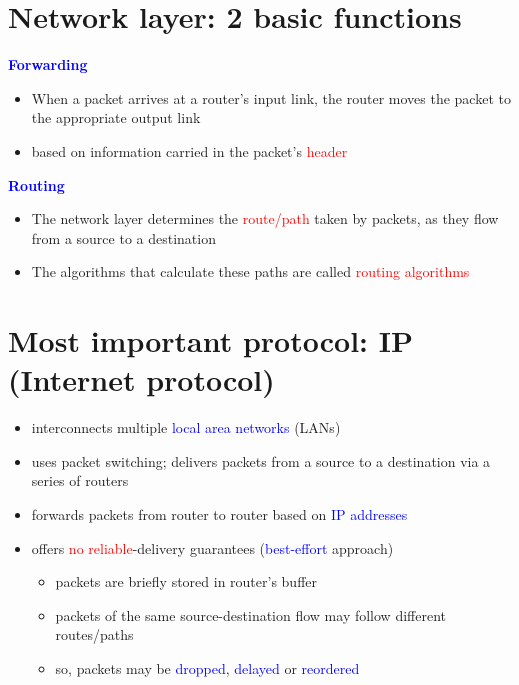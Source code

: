 \documentclass[11pt]{article}
\begin{document}
\section*{Network layer: 2 basic functions}

\textbf{\textcolor{blue}{Forwarding}}

\begin{itemize}
	\item When a packet arrives at a router's input link, the router moves the packet to the appropriate output link
	\item based on information carried in the packet's \textcolor{red}{header}
\end{itemize}

\textbf{\textcolor{blue}{Routing}}
\begin{itemize}
	\item The network layer determines the \textcolor{red}{route/path} taken by packets, as they flow from a source to a destination
	\item The algorithms that calculate these paths are called \textcolor{red}{routing algorithms}
\end{itemize}

\section*{Most important protocol: IP (Internet protocol)}

\begin{itemize}
	\item interconnects multiple \textcolor{blue}{local area networks} (LANs)
	\item uses packet switching; delivers packets from a source to a destination via a series of routers
	\item forwards packets from router to router based on \textcolor{blue}{IP addresses}
	\item offers \textcolor{red}{no reliable}-delivery guarantees (\textcolor{blue}{best-effort} approach)
	\begin{itemize}
		\item packets are briefly stored in router's buffer
		\item packets of the same source-destination flow may follow different routes/paths
		\item so, packets may be \textcolor{blue}{dropped}, \textcolor{blue}{delayed} or \textcolor{blue}{reordered}
	\end{itemize}
	
\end{itemize}
\end{document}
